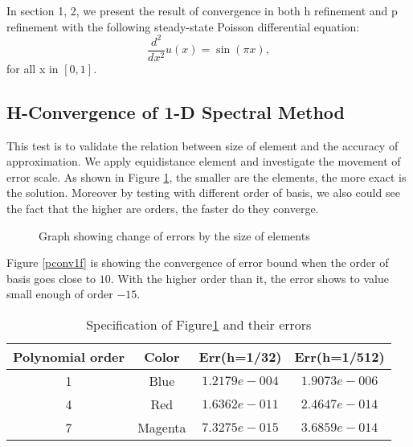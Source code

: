In section 1, 2, we present the result of convergence in both h
refinement and p refinement with the following steady-state
Poisson differential equation:
\begin{equation*}
    \frac{d^2}{dx^2} u(x) = \sin(\pi x),
\end{equation*}
for all x in $[0, 1]$.


\subsection {H-Convergence of 1-D Spectral Method}

This test is to validate the relation between size of element and
the accuracy of approximation. We apply equidistance element and
investigate the movement of error scale. As shown in Figure
\ref{hconv1f}, the smaller are the elements, the more exact is the
solution. Moreover by testing with different order of basis, we
also could see the fact that the higher are orders, the faster do
they converge.

\begin{figure}[h]
\begin{center}
\caption{\label{hconv1f}Graph showing change of errors by the size
of elements}
\end{center}
\end{figure}

Figure \ref{pconv1f} is showing the convergence of error bound
when the order of basis goes close to $10$. With the higher order
than it, the error shows to value small enough of order $-15$.

\begin{table}[h]
\centering \caption{\label{hconv1t} Specification of
                              Figure\ref{hconv1f} and their errors}
\begin{tabular}{|c|c|c|c|} \hline
Polynomial order&Color&Err(h=1/32)&Err(h=1/512)   \\ \hline \hline
    1&Blue   &$1.2179e-004$ &$1.9073e-006$ \\ \hline
    4&Red    &$1.6362e-011$ &$2.4647e-014$ \\ \hline
    7&Magenta&$7.3275e-015$ &$3.6859e-014$ \\ \hline
\end{tabular}
\end{table}

\clearpage

